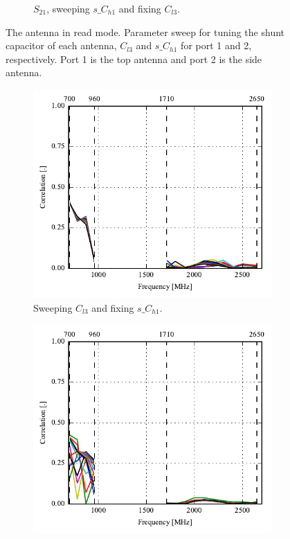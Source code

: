 \begin{figure}[htbp]
\begin{subfigure}[b]{0.49\linewidth}
        \caption{$S_{21}$, sweeping $s\_C_{h1}$ and fixing $C_{l3}$.}
    \end{subfigure}
    \caption{The antenna in read mode. Parameter sweep for tuning the shunt capacitor of each antenna, $C_{l3}$ and $s\_C_{h1}$ for port 1 and 2, respectively. Port 1 is the top antenna and port 2 is the side antenna.}
    \label{fig:ant3_sparam_sweep_read}
\end{figure}

\begin{figure}[htbp]
    \centering
    \begin{subfigure}{0.49\linewidth}
        \includegraphics{img/tech_sol/nonresonant/simulation/read_mode/sweep_top_corr}
        \caption{Sweeping $C_{l3}$ and fixing $s\_C_{h1}$.}
    \end{subfigure}
    \hfill
    \begin{subfigure}{0.49\linewidth}
        \includegraphics{img/tech_sol/nonresonant/simulation/read_mode/sweep_side_corr}

\end{subfigure}
\end{figure}
